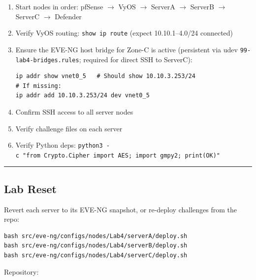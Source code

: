 \begin{enumerate}
\def\labelenumi{\arabic{enumi}.}
\item
  Start nodes in order: pfSense $\rightarrow$ VyOS $\rightarrow$ ServerA $\rightarrow$ ServerB $\rightarrow$ ServerC $\rightarrow$ Defender
\item
  Verify VyOS routing: \texttt{show\ ip\ route} (expect 10.10.1--4.0/24 connected)
\item
  Ensure the EVE-NG host bridge for Zone-C is active (persistent via udev \texttt{99-lab4-bridges.rules}; required for direct SSH to ServerC):

\begin{lstlisting}
ip addr show vnet0_5   # Should show 10.10.3.253/24
# If missing:
ip addr add 10.10.3.253/24 dev vnet0_5
\end{lstlisting}
\item
  Confirm SSH access to all server nodes
\item
  Verify challenge files on each server
\item
  Verify Python deps: \texttt{python3\ -c\ "from\ Crypto.Cipher\ import\ AES;\ import\ gmpy2;\ print(\textquotesingle{}OK\textquotesingle{})"}
\end{enumerate}

\begin{center}\rule{0.5\linewidth}{0.5pt}\end{center}

\subsection{Lab Reset}

Revert each server to its EVE-NG snapshot, or re-deploy challenges from the repo:

\begin{lstlisting}
bash src/eve-ng/configs/nodes/Lab4/serverA/deploy.sh
bash src/eve-ng/configs/nodes/Lab4/serverB/deploy.sh
bash src/eve-ng/configs/nodes/Lab4/serverC/deploy.sh
\end{lstlisting}

Repository: \href{https://github.com/TheEgea/TFG/tree/main/src/eve-ng/configs/nodes/Lab4}{}
